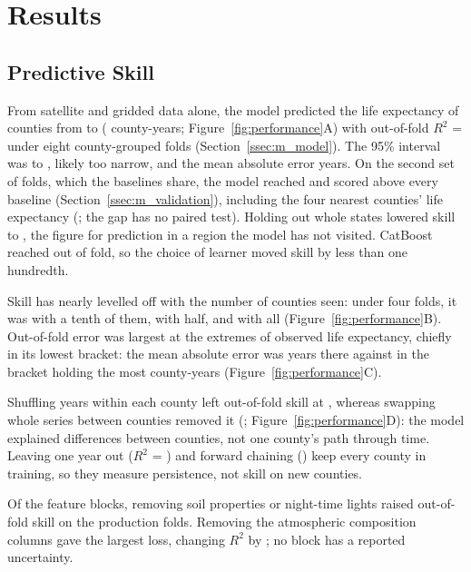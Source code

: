 \documentclass[sensors,article,submit,moreauthors,pdftex]{Definitions/mdpi}
\begin{document}
\section{Results}
\label{sec:results}

\subsection{Predictive Skill}
\label{ssec:r_model}
From satellite and gridded data alone, the model predicted the life expectancy of \Ncounties{} counties from \YearStart{} to \YearEnd{}
(\Nobs{} county-years; Figure~\ref{fig:performance}A) with out-of-fold $R^{2}$ = \Rtwo{} under eight county-grouped folds (Section~\ref{ssec:m_model}). The 95\%
interval was \RtwoCIlo{} to \RtwoCIhi{}, likely too narrow, and the mean absolute error \MAEmodel{} years.
On the second set of folds, which the baselines share, the model reached
\ArmAllRtwo{} and scored above every baseline (Section~\ref{ssec:m_validation}), including the four nearest counties'
life expectancy (\BlKnn{}; the gap has no paired test). Holding out whole states lowered skill to
\HoldStateRtwo{}, the figure for prediction in a region the model
has not visited. CatBoost reached \CatBoostRtwo{} out of fold, so the choice of learner
moved skill by less than one hundredth.

Skill has nearly levelled off with the number of counties seen: under four
folds, it was \LcTenRtwo{} with a tenth of them, \LcHalfRtwo{} with half, and
\LcFullRtwo{} with all (Figure~\ref{fig:performance}B). Out-of-fold error was largest at
the extremes of observed life expectancy, chiefly in its lowest bracket: the
mean absolute error was \BrLowMAE{} years there against \BrMidMAE{} in the
bracket holding the most county-years (Figure~\ref{fig:performance}C).

Shuffling years within each county left out-of-fold skill at \NullSkillWithin{}, whereas
swapping whole series between counties removed it (\NullSkillBetween{};
Figure~\ref{fig:performance}D): the model explained differences between
counties, not one county's path through time. Leaving one year out ($R^{2}$ =
\LoyoMean{}) and forward chaining (\FwdMean{}) keep every county in training,
so they measure persistence, not skill on new counties.

Of the \LOOnModalities{} feature blocks, removing soil properties or
night-time lights raised out-of-fold skill on the production folds. Removing the \LOOcamsN{}
atmospheric composition columns gave the largest loss, changing $R^{2}$ by \LOOcams{}; no block has a reported uncertainty.
\end{document}
